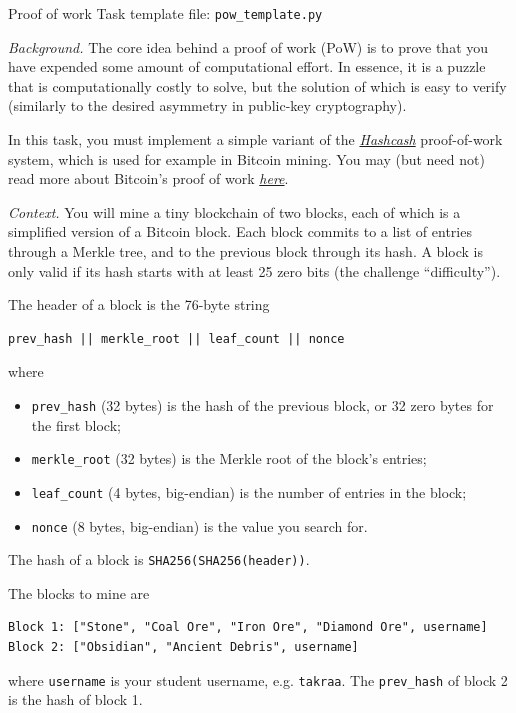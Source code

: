 \documentclass{homework}
\begin{document}
\begin{task}{Proof of work}
  Task template file: \texttt{pow\_template.py}

  \textit{Background.}
  The core idea behind a proof of work (PoW) is to prove that you have expended some amount of computational effort.
  In essence, it is a puzzle that is computationally costly to solve, but the solution of which is easy to verify (similarly to the desired asymmetry in public-key cryptography).

  In this task, you must implement a simple variant of the \href{https://en.wikipedia.org/wiki/Hashcash}{\textit{Hashcash}} proof-of-work system, which is used for example in Bitcoin mining.
  You may (but need not) read more about Bitcoin's proof of work \href{https://en.bitcoin.it/wiki/Proof_of_work}{\textit{here}}.

  \textit{Context.}
  You will mine a tiny blockchain of two blocks, each of which is a simplified version of a Bitcoin block.
  Each block commits to a list of entries through a Merkle tree, and to the previous block through its hash.
  A block is only valid if its hash starts with at least 25 zero bits (the challenge \enquote{difficulty}).

  \newpage

  The header of a block is the 76-byte string
  \begin{Verbatim}
prev_hash || merkle_root || leaf_count || nonce
  \end{Verbatim}
  where
  \begin{itemize}
    \item \texttt{prev\_hash} (32 bytes) is the hash of the previous block, or 32 zero bytes for the first block;
    \item \texttt{merkle\_root} (32 bytes) is the Merkle root of the block's entries;
    \item \texttt{leaf\_count} (4 bytes, big-endian) is the number of entries in the block;
    \item \texttt{nonce} (8 bytes, big-endian) is the value you search for.
  \end{itemize}
  The hash of a block is \texttt{SHA256(SHA256(header))}.

  The blocks to mine are
  \begin{Verbatim}
Block 1: ["Stone", "Coal Ore", "Iron Ore", "Diamond Ore", username]
Block 2: ["Obsidian", "Ancient Debris", username]
  \end{Verbatim}
  where \texttt{username} is your student username, e.g. \texttt{takraa}.
  The \texttt{prev\_hash} of block 2 is the hash of block 1.


\end{task}
\end{document}
